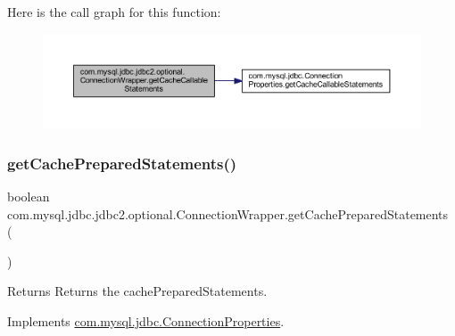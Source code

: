 Here is the call graph for this function\+:
\nopagebreak
\begin{figure}[H]
\begin{center}
\leavevmode
\includegraphics[width=350pt]{classcom_1_1mysql_1_1jdbc_1_1jdbc2_1_1optional_1_1_connection_wrapper_abc5b471648eac8eb49a7c16d561de680_cgraph}
\end{center}
\end{figure}
\mbox{\label{classcom_1_1mysql_1_1jdbc_1_1jdbc2_1_1optional_1_1_connection_wrapper_aa4e1e497dd1bc9785a1959db9989a97c}} 
\subsubsection{\texorpdfstring{get\+Cache\+Prepared\+Statements()}{getCachePreparedStatements()}}
{\footnotesize\ttfamily boolean com.\+mysql.\+jdbc.\+jdbc2.\+optional.\+Connection\+Wrapper.\+get\+Cache\+Prepared\+Statements (\begin{DoxyParamCaption}{ }\end{DoxyParamCaption})}

\begin{DoxyReturn}{Returns}
Returns the cache\+Prepared\+Statements. 
\end{DoxyReturn}


Implements \mbox{\hyperlink{interfacecom_1_1mysql_1_1jdbc_1_1_connection_properties_a74f3ae7b24eeb5ed44da99c60f664ac4}{com.\+mysql.\+jdbc.\+Connection\+Properties}}.

